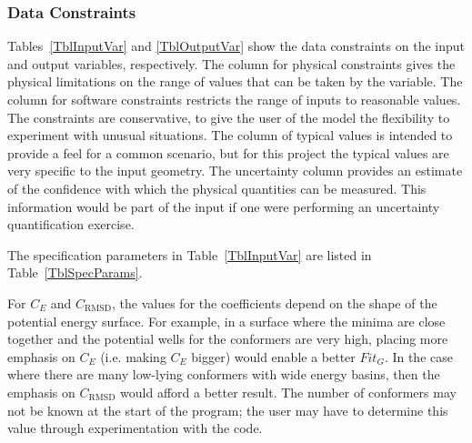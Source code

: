 \documentclass[12pt]{article}
\begin{document}

%

\subsubsection{Data Constraints} \label{sec_DataConstraints}    

Tables~\ref{TblInputVar} and \ref{TblOutputVar} show the data constraints on the
input and output variables, respectively.  The column for physical constraints gives
the physical limitations on the range of values that can be taken by the
variable.  The column for software constraints restricts the range of inputs to
reasonable values.  The constraints are conservative, to give the user of the
model the flexibility to experiment with unusual situations.  The column of
typical values is intended to provide a feel for a common scenario, but for 
this project the typical values are very specific to the input geometry.  The
uncertainty column provides an estimate of the confidence with which the
physical quantities can be measured.  This information would be part of the
input if one were performing an uncertainty quantification exercise.

The specification parameters in Table~\ref{TblInputVar} are listed in
Table~\ref{TblSpecParams}.


For $C_E$ and $C_\text{RMSD}$, the values for the coefficients depend on the shape 
of the potential energy surface. For example, in a surface where the minima are 
close together and the potential wells for the conformers are very high, 
placing more emphasis on $C_E$ (i.e. making $C_E$ bigger) would enable a better 
$Fit_G$. In the case where there are many low-lying conformers with wide energy 
basins, then the emphasis on $C_\text{RMSD}$ would afford a better result. The 
number of conformers may not be known at the start of the program; the user may 
have to determine this value through experimentation with the code.
\end{document}

